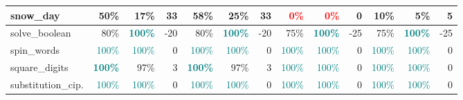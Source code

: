 \begin{table}[!h]
{\begin{tabular}{|p{2.9cm}|rr|r|rr|r||rr|r|rr|r|}
		snow\_day          & \textbf{50\%}                        & \multicolumn{1}{r|}{17\%}                             & \cellcolor[HTML]{FFDEAB}33   & \textbf{58\%}                    & \multicolumn{1}{r|}{25\%}                             & \cellcolor[HTML]{FFDEAB}33   & \textcolor{red}{0\%}                 & \multicolumn{1}{r|}{\textcolor{red}{0\%}}    & \cellcolor[HTML]{FFFFFF}0    & \textbf{10\%}                    & \multicolumn{1}{r|}{5\%}                              & \cellcolor[HTML]{FFFAF3}5    \\ \hline
		solve\_boolean     & 80\%                                 & \multicolumn{1}{r|}{\textcolor{teal}{\textbf{100\%}}} & \cellcolor[HTML]{DAE6FA}-20  & 80\%                             & \multicolumn{1}{r|}{\textcolor{teal}{\textbf{100\%}}} & \cellcolor[HTML]{DAE6FA}-20  & 75\%                                 & \multicolumn{1}{r|}{\textcolor{teal}{\textbf{100\%}}} & \cellcolor[HTML]{D1E0F9}-25  & 75\%                             & \multicolumn{1}{r|}{\textcolor{teal}{\textbf{100\%}}} & \cellcolor[HTML]{D1E0F9}-25  \\ \hline
		spin\_words        & \textcolor{teal}{100\%}              & \multicolumn{1}{r|}{\textcolor{teal}{100\%}}          & \cellcolor[HTML]{FFFFFF}0    & \textcolor{teal}{100\%}          & \multicolumn{1}{r|}{\textcolor{teal}{100\%}}          & \cellcolor[HTML]{FFFFFF}0    & \textcolor{teal}{100\%}              & \multicolumn{1}{r|}{\textcolor{teal}{100\%}} & \cellcolor[HTML]{FFFFFF}0    & \textcolor{teal}{100\%}          & \multicolumn{1}{r|}{\textcolor{teal}{100\%}}          & \cellcolor[HTML]{FFFFFF}0    \\ \hline
		square\_digits     & \textcolor{teal}{\textbf{100\%}}     & \multicolumn{1}{r|}{97\%}                             & \cellcolor[HTML]{FFFCF8}3    & \textcolor{teal}{\textbf{100\%}} & \multicolumn{1}{r|}{97\%}                             & \cellcolor[HTML]{FFFCF8}3    & \textcolor{teal}{100\%}              & \multicolumn{1}{r|}{\textcolor{teal}{100\%}} & \cellcolor[HTML]{FFFFFF}0    & \textcolor{teal}{100\%}          & \multicolumn{1}{r|}{\textcolor{teal}{100\%}}          & \cellcolor[HTML]{FFFFFF}0    \\ \hline
		substitution\_cip. & \textcolor{teal}{100\%}              & \multicolumn{1}{r|}{\textcolor{teal}{100\%}}          & \cellcolor[HTML]{FFFFFF}0    & \textcolor{teal}{100\%}          & \multicolumn{1}{r|}{\textcolor{teal}{100\%}}          & \cellcolor[HTML]{FFFFFF}0    & \textcolor{teal}{100\%}              & \multicolumn{1}{r|}{\textcolor{teal}{100\%}} & \cellcolor[HTML]{FFFFFF}0    & \textcolor{teal}{100\%}          & \multicolumn{1}{r|}{\textcolor{teal}{100\%}}          & \cellcolor[HTML]{FFFFFF}0    \\ \hline

\end{tabular}}
\end{table}
